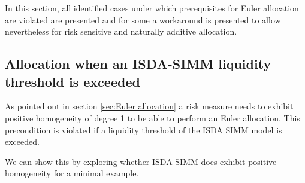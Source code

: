 \documentclass[../Thesis_AHoecherl.tex]{subfiles}
\begin{document}
    In this section, all identified cases under which prerequisites for Euler allocation are violated are presented and for some a workaround is presented to allow nevertheless for risk sensitive and naturally additive allocation.
    
    \subsection{Allocation when an ISDA-SIMM liquidity threshold is exceeded\label{sec:Allocation when an ISDA-SIMM liquidity threshold is exceeded}}
    
    As pointed out in section \ref{sec:Euler allocation} a risk measure needs to exhibit positive homogeneity of degree 1 to be able to perform an Euler allocation.
    This precondition is violated if a liquidity threshold of the \gls{ISDA SIMM} model is exceeded.

    We can show this by exploring whether \gls{ISDA SIMM} does exhibit positive homogeneity for a minimal example.
    
\end{document}
